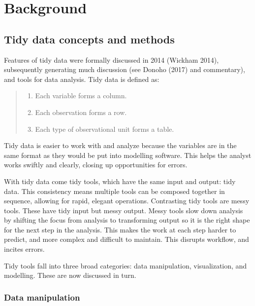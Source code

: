 \documentclass[]{article}
\providecommand{\tightlist}{%
  \setlength{\itemsep}{0pt}\setlength{\parskip}{0pt}}
\theoremstyle{definition}
\theoremstyle{definition}
\theoremstyle{definition}
\theoremstyle{remark}
\begin{document}
\hypertarget{background}{%
\section{Background}\label{background}}

\hypertarget{tidy-data-concepts}{%
\subsection{Tidy data concepts and methods}\label{tidy-data-concepts}}

Features of tidy data were formally discussed in 2014 (Wickham 2014),
subsequently generating much discussion (see Donoho (2017) and
commentary), and tools for data analysis. Tidy data is defined as:

\begin{quote}
\begin{enumerate}
\def\labelenumi{\arabic{enumi}.}
\tightlist
\item
  Each variable forms a column.
\item
  Each observation forms a row.
\item
  Each type of observational unit forms a table.
\end{enumerate}
\end{quote}

Tidy data is easier to work with and analyze because the variables are
in the same format as they would be put into modelling software. This
helps the analyst works swiftly and clearly, closing up opportunities
for errors.

With tidy data come tidy tools, which have the same input and output:
tidy data. This consistency means multiple tools can be composed
together in sequence, allowing for rapid, elegant operations.
Contrasting tidy tools are messy tools. These have tidy input but messy
output. Messy tools slow down analysis by shifting the focus from
analysis to transforming output so it is the right shape for the next
step in the analysis. This makes the work at each step harder to
predict, and more complex and difficult to maintain. This disrupts
workflow, and incites errors.

Tidy tools fall into three broad categories: data manipulation,
visualization, and modelling. These are now discussed in turn.

\hypertarget{tidy-data-manip}{%
\subsubsection{Data manipulation}\label{tidy-data-manip}}
\end{document}
